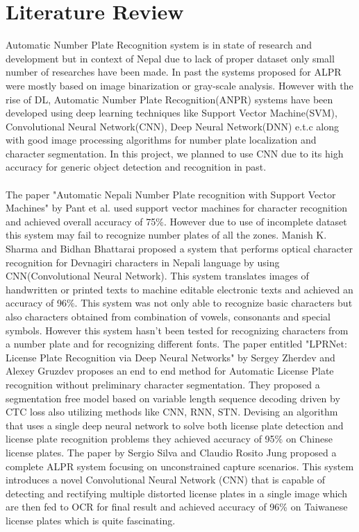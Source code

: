 \chapter{Literature Review}
Automatic Number Plate Recognition system is in state of research and development but in context of Nepal due to lack of proper dataset only small number of researches have been made. In past the systems proposed for ALPR were mostly based on image binarization or gray-scale analysis. However with the rise of DL, Automatic Number Plate Recognition(ANPR) systems have been developed using deep learning techniques like Support Vector Machine(SVM), Convolutional Neural Network(CNN), Deep Neural Network(DNN) e.t.c along with good image processing algorithms for number plate localization and character segmentation. In this project, we planned to use CNN due to its high accuracy for generic object detection and recognition in past.\\\\
The paper "Automatic Nepali Number Plate recognition with Support Vector Machines" by Pant et al. \cite{pant2015automatic} used support vector machines for character recognition and achieved overall accuracy of 75\%. However due to use of incomplete dataset this system may fail to recognize number plates of all the zones. Manish K. Sharma and Bidhan Bhattarai \cite{sharma2017optical} proposed a system that performs optical character recognition for Devnagiri characters in Nepali language by using CNN(Convolutional Neural Network). This system translates images of handwritten or printed texts to machine editable electronic texts and achieved an accuracy of 96\%. This system was not only able to recognize basic characters but also characters obtained from combination of vowels, consonants and special symbols. However this system hasn't been tested for recognizing characters from a number plate and for recognizing different fonts. The paper entitled "LPRNet: License Plate Recognition via Deep Neural Networks" by Sergey Zherdev and Alexey Gruzdev \cite{zherzdev2018lprnet} proposes an end to end method for Automatic License Plate recognition without preliminary character segmentation. They proposed a segmentation free model based on variable length sequence decoding driven by CTC loss also utilizing methods like CNN, RNN, STN. Devising an algorithm that uses a single deep neural network to solve both license plate detection and license plate recognition problems they achieved accuracy of 95\% on Chinese license plates. The paper by Sergio Silva and Claudio Rosito Jung \cite{silva2018license} proposed a complete ALPR system focusing on unconstrained capture scenarios. This system introduces a novel Convolutional Neural Network (CNN) that is capable of detecting and rectifying multiple distorted license plates in a single image which are then fed to OCR for final result and achieved accuracy of 96\% on Taiwanese license plates which is quite fascinating.\\
